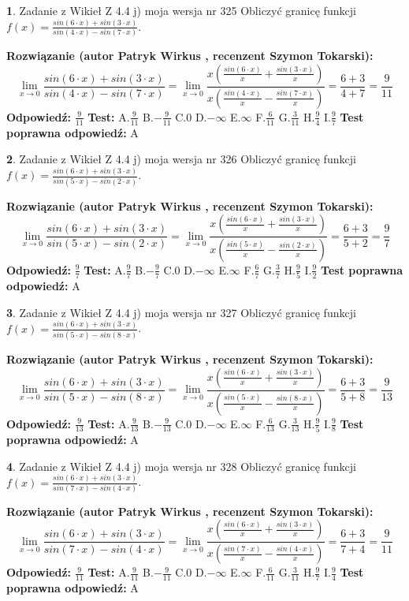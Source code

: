 \documentclass[12pt, a4paper]{article}
\theoremstyle{definition} %
\newtheorem{zad}{}
\newcommand{\zadStart}[1]{\begin{zad}#1\newline}
\newcommand{\zadStop}{\end{zad}}
\newcommand{\rozwStart}[2]{\noindent \textbf{Rozwiązanie (autor #1 , recenzent #2): }\newline}
\newcommand{\rozwStop}{\newline}
\newcommand{\odpStart}{\noindent \textbf{Odpowiedź:}\newline}
\newcommand{\odpStop}{\newline}
\newcommand{\testStart}{\noindent \textbf{Test:}\newline}
\newcommand{\testStop}{\newline}
\newcommand{\kluczStart}{\noindent \textbf{Test poprawna odpowiedź:}\newline}
\newcommand{\kluczStop}{\newline}
\begin{document}
\zadStart{Zadanie z Wikieł Z 4.4 j) moja wersja nr 325}
Obliczyć granicę funkcji $f(x)=\frac{sin(6\cdot x) +sin(3\cdot x)}{sin(4\cdot x) -sin(7\cdot x)}$.
\zadStop
\rozwStart{Patryk Wirkus}{Szymon Tokarski}
$$\lim\limits_{x\to 0}\frac{sin(6\cdot x) +sin(3\cdot x)}{sin(4\cdot x) -sin(7\cdot x)}=\lim\limits_{x\to 0}\frac{x(\frac{sin(6\cdot x)}{x}+\frac{sin(3\cdot x)}{x})}{x(\frac{sin(4\cdot x)}{x}-\frac{sin(7\cdot x)}{x})}=\frac{6+3}{4+7} = \frac{9}{11}$$
\rozwStop
\odpStart
$\frac{9}{11}$
\odpStop
\testStart
A.$\frac{9}{11}$
B.$-\frac{9}{11}$
C.$0$
D.$-\infty$
E.$\infty$
F.$\frac{6}{11}$
G.$\frac{3}{11}$
H.$\frac{9}{4}$
I.$\frac{9}{7}$
\testStop
\kluczStart
A
\kluczStop



\zadStart{Zadanie z Wikieł Z 4.4 j) moja wersja nr 326}
Obliczyć granicę funkcji $f(x)=\frac{sin(6\cdot x) +sin(3\cdot x)}{sin(5\cdot x) -sin(2\cdot x)}$.
\zadStop
\rozwStart{Patryk Wirkus}{Szymon Tokarski}
$$\lim\limits_{x\to 0}\frac{sin(6\cdot x) +sin(3\cdot x)}{sin(5\cdot x) -sin(2\cdot x)}=\lim\limits_{x\to 0}\frac{x(\frac{sin(6\cdot x)}{x}+\frac{sin(3\cdot x)}{x})}{x(\frac{sin(5\cdot x)}{x}-\frac{sin(2\cdot x)}{x})}=\frac{6+3}{5+2} = \frac{9}{7}$$
\rozwStop
\odpStart
$\frac{9}{7}$
\odpStop
\testStart
A.$\frac{9}{7}$
B.$-\frac{9}{7}$
C.$0$
D.$-\infty$
E.$\infty$
F.$\frac{6}{7}$
G.$\frac{3}{7}$
H.$\frac{9}{5}$
I.$\frac{9}{2}$
\testStop
\kluczStart
A
\kluczStop



\zadStart{Zadanie z Wikieł Z 4.4 j) moja wersja nr 327}
Obliczyć granicę funkcji $f(x)=\frac{sin(6\cdot x) +sin(3\cdot x)}{sin(5\cdot x) -sin(8\cdot x)}$.
\zadStop
\rozwStart{Patryk Wirkus}{Szymon Tokarski}
$$\lim\limits_{x\to 0}\frac{sin(6\cdot x) +sin(3\cdot x)}{sin(5\cdot x) -sin(8\cdot x)}=\lim\limits_{x\to 0}\frac{x(\frac{sin(6\cdot x)}{x}+\frac{sin(3\cdot x)}{x})}{x(\frac{sin(5\cdot x)}{x}-\frac{sin(8\cdot x)}{x})}=\frac{6+3}{5+8} = \frac{9}{13}$$
\rozwStop
\odpStart
$\frac{9}{13}$
\odpStop
\testStart
A.$\frac{9}{13}$
B.$-\frac{9}{13}$
C.$0$
D.$-\infty$
E.$\infty$
F.$\frac{6}{13}$
G.$\frac{3}{13}$
H.$\frac{9}{5}$
I.$\frac{9}{8}$
\testStop
\kluczStart
A
\kluczStop



\zadStart{Zadanie z Wikieł Z 4.4 j) moja wersja nr 328}
Obliczyć granicę funkcji $f(x)=\frac{sin(6\cdot x) +sin(3\cdot x)}{sin(7\cdot x) -sin(4\cdot x)}$.
\zadStop
\rozwStart{Patryk Wirkus}{Szymon Tokarski}
$$\lim\limits_{x\to 0}\frac{sin(6\cdot x) +sin(3\cdot x)}{sin(7\cdot x) -sin(4\cdot x)}=\lim\limits_{x\to 0}\frac{x(\frac{sin(6\cdot x)}{x}+\frac{sin(3\cdot x)}{x})}{x(\frac{sin(7\cdot x)}{x}-\frac{sin(4\cdot x)}{x})}=\frac{6+3}{7+4} = \frac{9}{11}$$
\rozwStop
\odpStart
$\frac{9}{11}$
\odpStop
\testStart
A.$\frac{9}{11}$
B.$-\frac{9}{11}$
C.$0$
D.$-\infty$
E.$\infty$
F.$\frac{6}{11}$
G.$\frac{3}{11}$
H.$\frac{9}{7}$
I.$\frac{9}{4}$
\testStop
\kluczStart
A
\kluczStop
\end{document}
